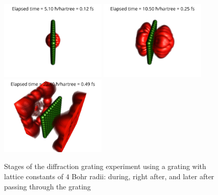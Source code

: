 \begin{figure}[hbt!]
	\begin{center}
		\includegraphics[width=0.45\textwidth]{figures/optical_grid_01.png}
		\includegraphics[width=0.45\textwidth]{figures/optical_grid_02.png}
		\includegraphics[width=0.45\textwidth]{figures/optical_grid_03.png}
		\caption{Stages of the diffraction grating experiment using a grating with lattice constants of $4$ Bohr radii: during, right after, and later after passing through the grating}
		\label{fig:optical_grid_stages}
	\end{center}	
\end{figure}

